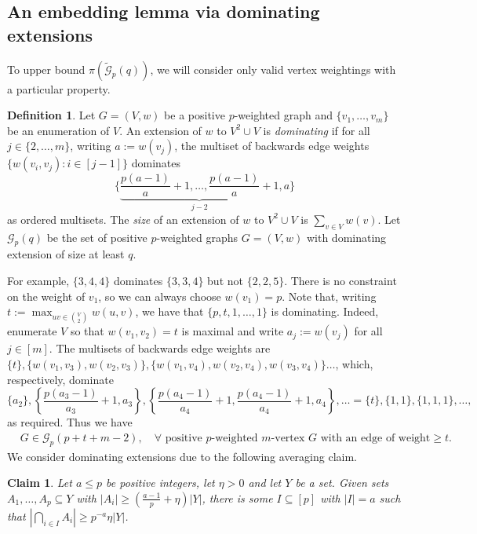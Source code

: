 \documentclass[11pt, a4paper]{article}
\newtheorem{claim}[theorem]{Claim}
\theoremstyle{definition}
\newtheorem{definition}[theorem]{Definition}
\newcommand{\cG}{\mathcal{G}}
\begin{document}
\subsection{An embedding lemma via dominating extensions}\label{sec-embedding}
To upper bound $\pi(\widetilde{\cG}_p(q))$, we will consider only valid vertex weightings with a particular property.
\begin{definition}
	Let $G=(V,w)$ be a positive $p$-weighted graph and $\lbrace v_1,\ldots,v_m\rbrace$ be an enumeration of $V$. An extension of $w$ to $V^2 \cup V$ is \emph{dominating} if  for all $j \in \{2,\ldots,m\}$, writing $a:=w(v_j)$, the multiset of backwards edge weights $\lbrace w(v_i,v_j) : i \in [j-1]\rbrace$ dominates
	$$
	\Big\lbrace \underbrace{\textstyle{\frac{p(a-1)}{a}+1,\ldots,\frac{p(a-1)}{a}+1}}_{j-2}, a\Big\rbrace
	$$
	as ordered multisets.
	The \emph{size} of an extension of $w$ to $V^2 \cup V$ is $\sum_{v \in V}w(v)$. 
	Let $\mathcal{G}_p(q)$ be the set of positive $p$-weighted graphs $G=(V,w)$ with dominating extension of size at least $q$.
\end{definition}

For example, $\{3,4,4\}$ dominates $\{3,3,4\}$ but not $\{2,2,5\}$.
There is no constraint on the weight of $v_1$, so we can always choose $w(v_1)=p$.
Note that, writing $t := \max_{uv \in \binom{V}{2}}w(u,v)$, we have that $\{p,t,1,\ldots, 1\}$ is dominating.
Indeed, enumerate $V$ so that $w(v_1,v_2)=t$ is maximal and write $a_j := w(v_j)$ for all $j \in [m]$.
The multisets of backwards edge weights are $\{t\},\{w(v_1,v_3),w(v_2,v_3)\},\{w(v_1,v_4),w(v_2,v_4),w(v_3,v_4)\}\ldots$, which, respectively,
dominate
$$
\{a_2\},\left\{\frac{p(a_3-1)}{a_3}+1, a_3\right\},\left\{\frac{p(a_4-1)}{a_4}+1,\frac{p(a_4-1)}{a_4}+1,a_4\right\},\ldots = \{t\},\{1,1\},\{1,1,1\},\ldots,
$$
as required. 
Thus we have
\begin{align}\label{eq:mq}
	&G \in \cG_p(p+t+m-2), \quad\forall\text{ positive } p\text{-weighted } m\text{-vertex } G \text{ with an edge of weight}\geq t.
\end{align}
We consider dominating extensions due to the following averaging claim.
\begin{claim}\label{cl:int}
	Let $a \leq p$ be positive integers, let $\eta > 0$ and let $Y$ be a set.
	Given sets $A_1,\ldots,A_p \subseteq Y$ with $|A_i| \geq (\frac{a-1}{p}+\eta)|Y|$, there is some $I \subseteq [p]$ with $|I|=a$ such that $|\bigcap_{i \in I}A_i| \geq p^{-a}\eta|Y|$.
\end{claim}
\end{document}
